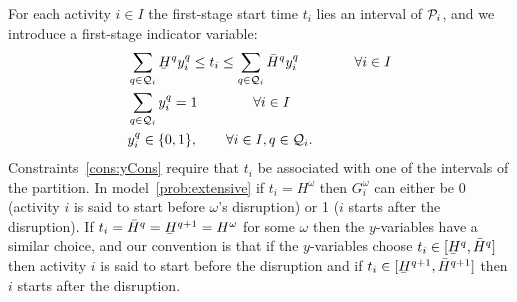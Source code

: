 \documentclass[11pt]{article}
\newcommand{\cQ}{{\cal Q}}
\newcommand{\cP}{{\cal P}}
\renewcommand{\underbar}{\underaccent{\bar}}
\begin{document}
	For each activity \(i \in I\) the first-stage start time \(t_i\) lies an interval of \(\cP_i\), and we introduce a first-stage indicator variable:
	\begin{subequations} \label{cons:yCons}
		\begin{align}
			& \sum_{q \in \cQ_i} \underbar{H}^q y_i^{q} \leq t_i \leq \sum_{q \in \cQ_i} \bar{H}^q y_i^{q} \qquad \qquad \forall i \in I \label{cons:tyBounds}\\
			& \sum_{q \in \cQ_i} y_i^q = 1 \qquad \qquad \forall i \in I \label{cons:sumy1} \\
			& y_i^q \in \{0,1\}, \quad \quad \forall i \in I, q \in \cQ_i.
		\end{align}
	\end{subequations}
	{Constraints~\eqref{cons:yCons} require that \(t_i\) be associated with one of the intervals of the partition. In model~\eqref{prob:extensive} if $t_i=H^\omega$ then $G_i^\omega$ can either be 0 (activity $i$ is said to start before $\omega$'s disruption) or 1 ($i$ starts after the disruption). If $t_i=\bar{H}^q = \underbar{H}^{q + 1}=H^\omega$ for some $\omega$ then the $y$-variables have a similar choice, and our convention is that if the $y$-variables choose $t_i \in [\underbar{H}^q,\bar{H}^q]$ then activity $i$ is said to start before the disruption and if $t_i \in [\underbar{H}^{q+1},\bar{H}^{q+1}]$ then $i$ starts after the disruption.}
\end{document}
